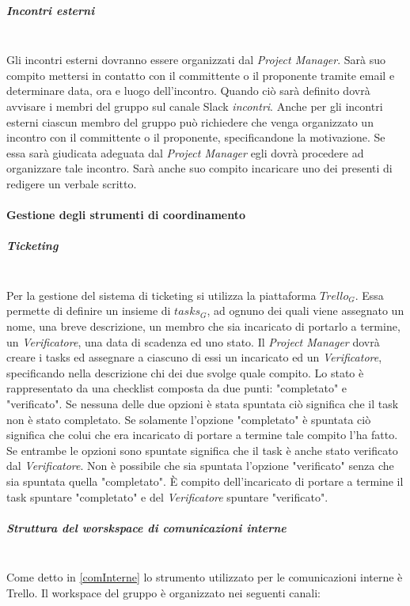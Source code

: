 			\subparagraph{Incontri esterni} \mbox{} \\
			 Gli incontri esterni dovranno essere organizzati dal \emph{Project Manager}. Sarà suo compito mettersi in contatto con il committente o il proponente tramite email e determinare data, ora e luogo dell'incontro. Quando ciò sarà definito dovrà avvisare i membri del gruppo sul canale Slack \emph{incontri}. Anche per gli incontri esterni ciascun membro del gruppo può richiedere che venga organizzato un incontro con il committente o il proponente, specificandone la motivazione. Se essa sarà giudicata adeguata dal \emph{Project Manager} egli dovrà procedere ad organizzare tale incontro. Sarà anche suo compito incaricare uno dei presenti di redigere un verbale scritto.
		\paragraph{Gestione degli strumenti di coordinamento}
			\subparagraph{Ticketing} \mbox{} \\
			Per la gestione del sistema di ticketing si utilizza la piattaforma $Trello_G$. Essa permette di definire un insieme di $tasks_G$, ad ognuno dei quali viene assegnato un nome, una breve descrizione, un membro che sia incaricato di portarlo a termine, un \emph{Verificatore}, una data di scadenza ed uno stato. Il \emph{Project Manager} dovrà creare i tasks ed assegnare a ciascuno di essi un incaricato ed un \emph{Verificatore}, specificando nella descrizione chi dei due svolge quale compito. Lo stato è rappresentato da una checklist composta da due punti: "completato" e "verificato". Se nessuna delle due opzioni è stata spuntata ciò significa che il task non è stato completato. Se solamente l'opzione "completato" è spuntata ciò significa che colui che era incaricato di portare a termine tale compito l'ha fatto. Se entrambe le opzioni sono spuntate significa che il task è anche stato verificato dal \emph{Verificatore}. Non è possibile che sia spuntata l'opzione "verificato" senza che sia spuntata quella "completato". È compito dell'incaricato di portare a termine il task spuntare "completato" e del \emph{Verificatore} spuntare "verificato".
			\subparagraph{Struttura del worskspace di comunicazioni interne} \mbox{} \\
			Come detto in \ref{comInterne} lo strumento utilizzato per le comunicazioni interne è Trello. Il workspace del gruppo è organizzato nei seguenti canali:
